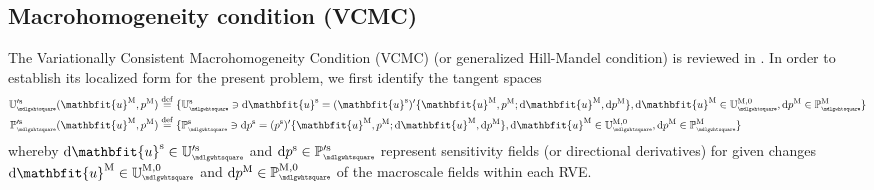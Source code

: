 \documentclass[12pt,a4paper]{article}
\renewcommand{\ta}[1]{\mathbfit{#1}}
\renewcommand{\Box}{\mdlgwhtsquare}
\newcommand{\rve}{
  {\mathchoice
   {\mbox{\scalebox{0.67}{$\Box$}}}
   {\mbox{\scalebox{0.67}{$\Box$}}}
   {\mbox{\scalebox{0.5}{$\Box$}}}
   {\mbox{\scalebox{0.375}{$\Box$}}}
  }
}
\begin{document}
\subsection{Macrohomogeneity condition (VCMC)}
The Variationally Consistent Macrohomogeneity Condition (VCMC) (or generalized Hill-Mandel condition) is reviewed in .
In order to establish its localized form for the present problem, we first identify the tangent spaces
\begin{subequations}
\begin{align}
 \set{U}_\rve^{\prime\fluct}(\ta u^\macro, p^\macro) &\defeq \{ \set{U}_\rve^\fluct \ni \dif\ta u^\fluct = (\ta u^\fluct)'\{\ta u^\macro, p^\macro; \dif\ta u^\macro, \dif p^\macro\}, \dif\ta u^\macro \in \set{U}_\rve^{\macro,0},  \dif p^\macro \in \set{P}_\rve^{\macro} \}
\\
 \set{P}_\rve^{\prime\fluct}(\ta u^\macro, p^\macro) &\defeq \{ \set{P}_\rve^\fluct \ni \dif p^\fluct = (p^\fluct)'\{\ta u^\macro, p^\macro; \dif\ta u^\macro, \dif p^\macro\}, \dif\ta u^\macro \in \set{U}_\rve^{\macro,0},  \dif p^\macro \in \set{P}_\rve^{\macro} \}
\end{align}
\end{subequations}
whereby $\dif\ta u^\fluct\in \set{U}_\rve^{\prime\fluct}$ and $\dif p^\fluct\in \set{P}_\rve^{\prime\fluct}$ represent sensitivity fields (or directional derivatives) for given changes $\dif\ta u^\macro \in\set{U}_\rve^{\macro,0}$ and $\dif p^\macro \in\set{P}_\rve^{\macro,0}$ of the macroscale fields within each RVE.
\end{document}
